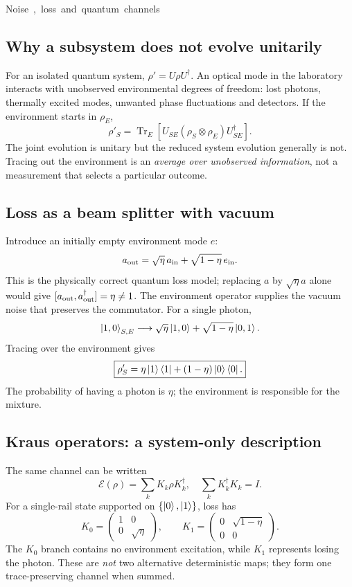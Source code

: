 \unit{Noise, loss and quantum channels}
\subsection{Why a subsystem does not evolve unitarily}
For an isolated quantum system,
\(\rho'=U\rho U^\dagger\).
An optical mode in the laboratory interacts
with unobserved environmental degrees of
freedom: lost photons, thermally excited
modes, unwanted phase fluctuations and detectors.
If the environment starts in \(\rho_E\),
\[
\boxed{\rho'_S=
\operatorname{Tr}_E[
U_{SE}(\rho_S\otimes\rho_E)U_{SE}^\dagger].}
\]
The joint evolution is unitary but the reduced
system evolution generally is not. Tracing out
the environment is an \emph{average over
unobserved information}, not a measurement
that selects a particular outcome.

\subsection{Loss as a beam splitter with vacuum}
Introduce an initially empty environment mode \(e\):
\[
a_{\rm out}=\sqrt\eta\,a_{\rm in}
+\sqrt{1-\eta}\,e_{\rm in}.
\]
This is the physically correct quantum loss
model; replacing \(a\) by \(\sqrt\eta a\)
alone would give
\([a_{\rm out},a_{\rm out}^\dagger]=\eta\ne1\).
The environment operator supplies the vacuum
noise that preserves the commutator.
For a single photon,
\[
\left\lvert 1,0\right\rangle_{S,E}\longrightarrow
\sqrt\eta\left\lvert 1,0\right\rangle
+\sqrt{1-\eta}\left\lvert 0,1\right\rangle.
\]
Tracing over the environment gives
\[
\boxed{\rho'_S=\eta\left\lvert 1\right\rangle\left\langle 1\right\rvert+
(1-\eta)\left\lvert 0\right\rangle\left\langle 0\right\rvert.}
\]
The probability of having a photon is \(\eta\);
the environment is responsible for the mixture.

\subsection{Kraus operators: a system-only description}
The same channel can be written
\[
\boxed{\mathcal E(\rho)=\sum_kK_k\rho K_k^\dagger,
\quad\sum_kK_k^\dagger K_k=I.}
\]
For a single-rail state supported on
\(\{\left\lvert 0\right\rangle,\left\lvert 1\right\rangle\}\), loss has
\[
K_0=\begin{pmatrix}1&0\\0&\sqrt\eta\end{pmatrix},
\qquad
K_1=\begin{pmatrix}0&\sqrt{1-\eta}\\0&0\end{pmatrix}.
\]
The \(K_0\) branch contains no environment
excitation, while \(K_1\) represents losing
the photon. These are \emph{not} two
alternative deterministic maps; they form
one trace-preserving channel when summed.

